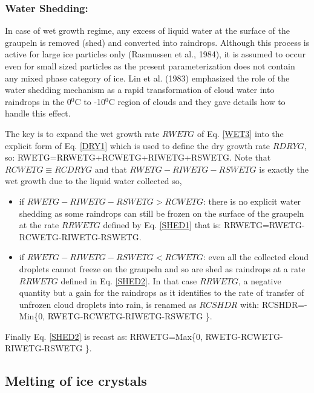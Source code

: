 \subsubsection{Water Shedding:}
%
In case of wet growth regime, any excess of liquid water at the surface of the
graupeln is removed (shed) and converted into raindrops. Although this process
is active for large ice particles only (Rasmussen et al., 1984), it is assumed
to occur even for small sized particles as the present parameterization does
not contain any mixed phase category of ice. Lin et al. (1983) emphasized the
role of the water shedding mechanism as a rapid transformation of cloud water
into raindrops in the 0$^0$C to -10$^0$C region of clouds and they gave details
how to handle this effect.

The key is to expand the wet growth rate $RWETG$ of Eq. \ref{WET3} into
the explicit form of Eq. \ref{DRY1} which is used to define the dry growth rate
$RDRYG$, so:
%
\be\label{SHED1}
RWETG=RRWETG+RCWETG+RIWETG+RSWETG.
\ee
%
\noindent Note that $RCWETG \equiv RCDRYG$ and that $RWETG-RIWETG-RSWETG$ is
exactly the wet growth due to the liquid water collected so,
\begin{itemize}
\item if $RWETG-RIWETG-RSWETG > RCWETG$: there is no explicit water shedding as
some raindrops can still be frozen on the surface of the graupeln at the rate
$RRWETG$ defined by Eq. \ref{SHED1} that is:
%
\be\label{SHED2}
RRWETG=RWETG-RCWETG-RIWETG-RSWETG.
\ee
%
\item if $RWETG-RIWETG-RSWETG < RCWETG$: even all the collected cloud droplets
cannot freeze on the graupeln and so are shed as raindrops at a rate $RRWETG$
defined in Eq. \ref{SHED2}. In that case $RRWETG$, a negative quantity but a
gain for the raindrops as it identifies to the rate of transfer of unfrozen
cloud droplets into rain, is renamed as $RCSHDR$ with:
%
\be\label{SHED3}
RCSHDR=-Min\Big\{0, RWETG-RCWETG-RIWETG-RSWETG \Big\}.
\ee
%
\end{itemize}

Finally Eq. \ref{SHED2} is recast as:
%
\be\label{SHED4}
RRWETG=Max\Big\{0, RWETG-RCWETG-RIWETG-RSWETG \Big\}.
\ee
%

%
\subsection{Melting of ice crystals}
%
%
